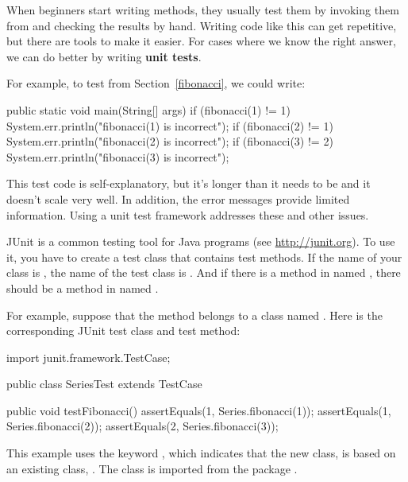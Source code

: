 
When beginners start writing methods, they usually test them by invoking them from  and checking the results by hand.
Writing code like this can get repetitive, but there are tools to make it easier.
For cases where we know the right answer, we can do better by writing {\bf unit tests}.

For example, to test  from Section~\ref{fibonacci}, we could write:

\begin{code}
public static void main(String[] args) {
    if (fibonacci(1) != 1) {
        System.err.println("fibonacci(1) is incorrect");
    }
    if (fibonacci(2) != 1) {
        System.err.println("fibonacci(2) is incorrect");
    }
    if (fibonacci(3) != 2) {
        System.err.println("fibonacci(3) is incorrect");
    }
}
\end{code}

This test code is self-explanatory, but it's longer than it needs to be and it doesn't scale very well.
In addition, the error messages provide limited information.
Using a unit test framework addresses these and other issues.

JUnit is a common testing tool for Java programs (see \url{http://junit.org}).
To use it, you have to create a test class that contains test methods.
If the name of your class is , the name of the test class is .
And if there is a method in  named , there should be a method in  named .

For example, suppose that the  method belongs to a class named .
Here is the corresponding JUnit test class and test method:

\begin{code}
import junit.framework.TestCase;

public class SeriesTest extends TestCase {

    public void testFibonacci() {
        assertEquals(1, Series.fibonacci(1));
        assertEquals(1, Series.fibonacci(2));
        assertEquals(2, Series.fibonacci(3));
    }
}
\end{code}

This example uses the keyword , which indicates that the new class,  is based on an existing class, .
The  class is imported from the package .

